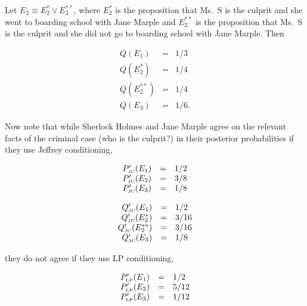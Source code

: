 \documentclass[phd,12pt,oneside]{ubcthesis}
\begin{document}
{\noindent}Let $E_{2}\equiv{}E_{2}^{*}\vee{}E_{2}^{**}$, where $E_{2}^{*}$ is the
proposition that Ms.\ S is the culprit and she went to boarding school
with Jane Marple and $E_{2}^{**}$ is the proposition that Ms.\ S is
the culprit and she did not go to boarding school with Jane Marple.
Then

\begin{equation}
  \label{eq:marpleprior}
  \begin{array}{rcl}
  Q(E_{1})&=&1/3\\
  Q(E_{2}^{*})&=&1/4\\
  Q(E_{2}^{**})&=&1/4\\
  Q(E_{3})&=&1/6.
\end{array}
\end{equation}

{\noindent}Now note that while Sherlock Holmes and Jane Marple agree on the
relevant facts of the criminal case (who is the culprit?) in their
posterior probabilities if they use Jeffrey conditioning,

\begin{equation}
  \label{eq:sherlockposteriorjc}
  \begin{array}{rcl}
  P'_{\mbox{\tiny JC}}(E_{1})&=&1/2\\
  P'_{\mbox{\tiny JC}}(E_{2})&=&3/8\\
  P'_{\mbox{\tiny JC}}(E_{3})&=&1/8
\end{array}
\end{equation}

\begin{equation}
  \label{eq:marpleposteriorjc}
  \begin{array}{rcl}
  Q'_{\mbox{\tiny JC}}(E_{1})&=&1/2\\
  Q'_{\mbox{\tiny JC}}(E_{2}^{*})&=&3/16\\
  Q'_{\mbox{\tiny JC}}(E_{2}^{**})&=&3/16\\
  Q'_{\mbox{\tiny JC}}(E_{3})&=&1/8
\end{array}
\end{equation}

{\noindent}they do not agree if they use LP conditioning,

\begin{equation}
  \label{eq:sherlockposteriorlp}
  \begin{array}{rcl}
  P'_{\mbox{\tiny LP}}(E_{1})&=&1/2\\
  P'_{\mbox{\tiny LP}}(E_{2})&=&5/12\\
  P'_{\mbox{\tiny LP}}(E_{3})&=&1/12
\end{array}
\end{equation}
\end{document}
